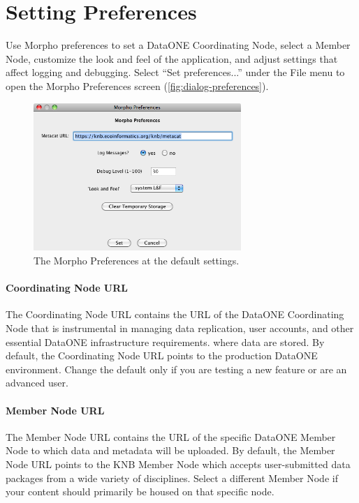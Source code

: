 \section{Setting Preferences} \label{sec:preferences}

Use Morpho preferences to set a DataONE Coordinating Node, select a 
Member Node, customize the look and feel
of the application, and adjust settings that affect logging and
debugging. Select ``Set preferences...'' under the File menu to open the
Morpho Preferences screen (\autoref{fig:dialog-preferences}).

\begin{figure}
  \centering
    \includegraphics[width=0.7\textwidth]{images/dialog-preferences.png}
  \caption{The Morpho Preferences at the default settings.}
  \label{fig:dialog-preferences}
\end{figure}

\paragraph{Coordinating Node URL} The Coordinating Node URL contains the URL 
of the DataONE Coordinating Node that is instrumental in managing data replication, 
user accounts, and other essential DataONE infrastructure requirements.
where data are stored. By default, the Coordinating Node URL points to the
production DataONE environment. Change the default only if you are testing a new feature or 
are an advanced user.

\paragraph{Member Node URL} The Member Node URL contains the URL of the specific
DataONE Member Node to which data and metadata will be uploaded. By default, the 
Member Node URL points to the KNB Member Node which accepts user-submitted 
data packages from a wide variety of disciplines. Select a different Member Node 
if your content should primarily be housed on that specific node.

